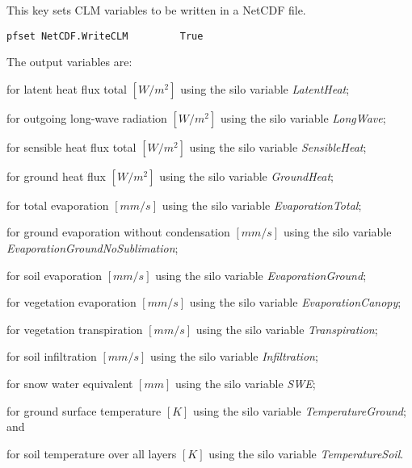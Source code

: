 {This key sets CLM variables to be written in a NetCDF file.}
\begin{display}\begin{verbatim}
pfset NetCDF.WriteCLM         True
\end{verbatim}\end{display}
The output variables are:
\begin{description}
\item {} for latent heat flux total $[W/m^2]$ using the silo variable {\em LatentHeat};
\item {} for outgoing long-wave radiation $[W/m^2]$ using the silo variable {\em LongWave};
\item {} for sensible heat flux total $[W/m^2]$ using the silo variable {\em SensibleHeat};
\item {} for ground heat flux $[W/m^2]$ using the silo variable {\em GroundHeat};
\item {} for total evaporation $[mm/s]$ using the silo variable {\em EvaporationTotal};
\item {} for ground evaporation without condensation $[mm/s]$ using the silo variable {\em EvaporationGroundNoSublimation};
\item {} for soil evaporation $[mm/s]$ using the silo variable {\em EvaporationGround};
\item {} for vegetation evaporation $[mm/s]$ using the silo variable {\em EvaporationCanopy};
\item {} for vegetation transpiration $[mm/s]$ using the silo variable {\em Transpiration};
\item {} for soil infiltration $[mm/s]$ using the silo variable {\em Infiltration};
\item {} for snow water equivalent $[mm]$ using the silo variable {\em SWE};
\item {} for ground surface temperature $[K]$ using the silo variable {\em TemperatureGround}; and
\item {} for soil temperature over all layers $[K]$ using the silo variable {\em TemperatureSoil}.
\end{description}

